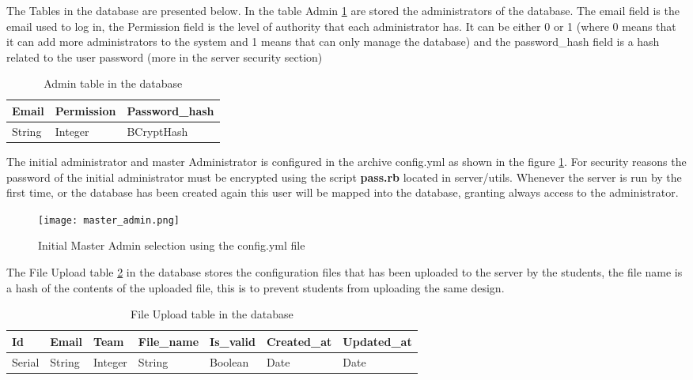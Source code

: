 The Tables in the database are presented below. In the table Admin \ref{tab:admin_table} are stored the administrators of the database. The email field is the email used to log in,
the Permission field is the level of authority that each administrator has. It can be either 0 or 1 (where 0 means that it can add
more administrators to the system and 1 means that can only manage the database) and the password\_hash field is a hash related to the user password (more in the server security section)

\begin{table}[h!]
\centering
    \begin{tabular}{ | l | l | l |}
    \hline
    Email & Permission & Password\_hash  \\ \hline
    String & Integer & BCryptHash \\ \hline
    \end{tabular}
    \caption{Admin table in the database}
    \label{tab:admin_table}
\end{table}

The initial administrator and master Administrator is configured in the archive config.yml as shown in the figure \ref{fig:admin_config}. For security reasons the password of
the initial administrator must be encrypted using the script {\bf pass.rb} located in server/utils. Whenever the server is run by the first time, or the database
has been created again this user will be mapped into the database, granting always access to the administrator.

\begin{figure}[htb]
\centering
\texttt{[image: master\_admin.png]}
\caption{Initial Master Admin selection using the config.yml file}
\label{fig:admin_config}
\end{figure}

The File Upload table \ref{tab:file_upload_table} in the database stores the configuration files that has been uploaded to the server by the students, the file name is a hash of the contents of the uploaded file,
this is to prevent students from uploading the same design.

\begin{table}[h!]
\centering
    \begin{tabular}{ | l | l | l | l | l | l | l |}
    \hline
    Id & Email & Team & File\_name & Is\_valid & Created\_at & Updated\_at  \\ \hline
    Serial & String & Integer & String & Boolean & Date & Date \\ \hline
    \end{tabular}
    \caption{File Upload table in the database}
    \label{tab:file_upload_table}
\end{table}

